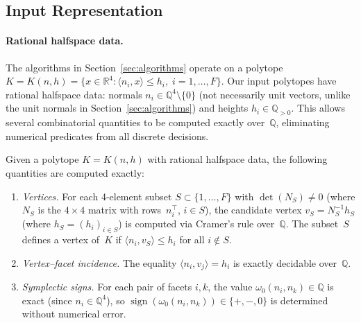 \subsection{Input Representation}\label{app:v2-input}


\paragraph{Rational halfspace data.}
The algorithms in Section~\ref{sec:algorithms} operate on a polytope
$K = K(n, h) = \{x \in \mathbb{R}^4 : \langle n_i, x \rangle \leq h_i,
\; i = 1, \ldots, F\}$.
Our input polytopes have rational halfspace data:
normals $n_i \in \mathbb{Q}^4 \setminus \{0\}$
(not necessarily unit vectors, unlike the unit normals
in Section~\ref{sec:algorithms})
and heights $h_i \in \mathbb{Q}_{>0}$.
This allows several combinatorial quantities to be
computed exactly over~$\mathbb{Q}$, eliminating
numerical predicates from all discrete decisions.


\begin{remark}%
\label{rem:v2-exact-quantities}
Given a polytope $K = K(n, h)$ with rational halfspace data,
the following quantities are computed exactly:
\begin{enumerate}
\item \emph{Vertices.}
  For each 4-element subset $S \subset \{1, \ldots, F\}$
  with $\det(N_S) \neq 0$ (where $N_S$ is the $4 \times 4$
  matrix with rows~$n_i^\top$, $i \in S$),
  the candidate vertex $v_S = N_S^{-1} h_S$
  (where $h_S = (h_i)_{i \in S}$) is computed
  via Cramer's rule over~$\mathbb{Q}$.
  The subset~$S$ defines a vertex of~$K$ if
  $\langle n_i, v_S \rangle \leq h_i$ for all $i \notin S$.
\item \emph{Vertex--facet incidence.}
  The equality $\langle n_i, v_j \rangle = h_i$
  is exactly decidable over~$\mathbb{Q}$.
\item \emph{Symplectic signs.}
  For each pair of facets $i, k$,
  the value $\omega_0(n_i, n_k) \in \mathbb{Q}$
  is exact (since $n_i \in \mathbb{Q}^4$),
  so $\operatorname{sign}(\omega_0(n_i, n_k))
  \in \{+, -, 0\}$ is determined without
  numerical error.
\end{enumerate}
\end{remark}

